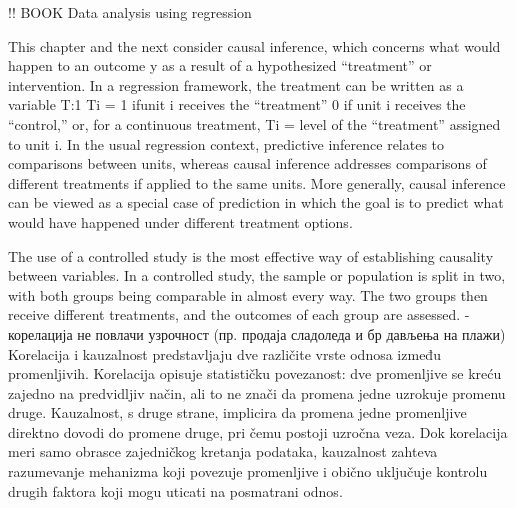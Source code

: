 \documentclass[12pt, a4paper]{article}
\begin{document}
!! BOOK Data analysis using regression

This chapter and the next consider causal inference, which concerns what would
 happen to an outcome y as a result of a hypothesized “treatment” or intervention.
 In a regression framework, the treatment can be written as a variable T:1
 Ti = 1 ifunit i receives the “treatment”
 0 if unit i receives the “control,”
 or, for a continuous treatment,
 Ti = level of the “treatment” assigned to unit i.
 In the usual regression context, predictive inference relates to comparisons between
 units, whereas causal inference addresses comparisons of different treatments if
 applied to the same units. More generally, causal inference can be viewed as a
 special case of prediction in which the goal is to predict what would have happened
 under different treatment options.


The use of a controlled study is the most effective way of establishing causality between variables. 
In a controlled study, the sample or population is split in two, with both groups being comparable in almost every way. 
The two groups then receive different treatments, and the outcomes of each group are assessed.
    - корелација не повлачи узрочност (пр. продаја сладоледа и бр дављења на плажи)
    Korelacija i kauzalnost predstavljaju dve različite vrste odnosa između promenljivih. 
    Korelacija opisuje statističku povezanost: dve promenljive se kreću zajedno na predvidljiv način, 
    ali to ne znači da promena jedne uzrokuje promenu druge. Kauzalnost, s druge strane, implicira da 
    promena jedne promenljive direktno dovodi do promene druge, pri čemu postoji uzročna veza. 
    Dok korelacija meri samo obrasce zajedničkog kretanja podataka, kauzalnost zahteva razumevanje 
    mehanizma koji povezuje promenljive i obično uključuje kontrolu drugih faktora koji mogu uticati na posmatrani odnos.
\end{document}
